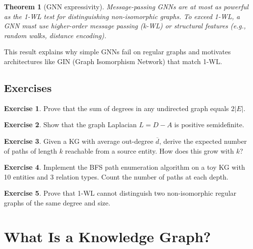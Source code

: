 \documentclass[11pt,a4paper,oneside,openany]{book}
\theoremstyle{definition}
\newtheorem{exercise}{Exercise}[chapter]
\theoremstyle{plain}
\newtheorem{theorem}{Theorem}[chapter]
\theoremstyle{remark}
\begin{document}
\begin{theorem}[GNN expressivity]
	\label{thm:wl-gnn}
	Message-passing GNNs are at most as powerful as the 1-WL test for distinguishing non-isomorphic graphs. To exceed 1-WL, a GNN must use higher-order message passing (k-WL) or structural features (e.g., random walks, distance encoding).
\end{theorem}

\noindent This result explains why simple GNNs fail on regular graphs and motivates architectures like GIN (Graph Isomorphism Network) that match 1-WL.

\section{Exercises}

\begin{exercise}
	Prove that the sum of degrees in any undirected graph equals $2|E|$.
\end{exercise}

\begin{exercise}
	Show that the graph Laplacian $L = D - A$ is positive semidefinite.
\end{exercise}

\begin{exercise}
	Given a KG with average out-degree $\overline{d}$, derive the expected number of paths of length $k$ reachable from a source entity. How does this grow with $k$?
\end{exercise}

\begin{exercise}
	Implement the BFS path enumeration algorithm on a toy KG with 10 entities and 3 relation types. Count the number of paths at each depth.
\end{exercise}

\begin{exercise}
	Prove that 1-WL cannot distinguish two non-isomorphic regular graphs of the same degree and size.
\end{exercise}

\chapter{What Is a Knowledge Graph?}\label{ch:what-is-kg}
\end{document}
